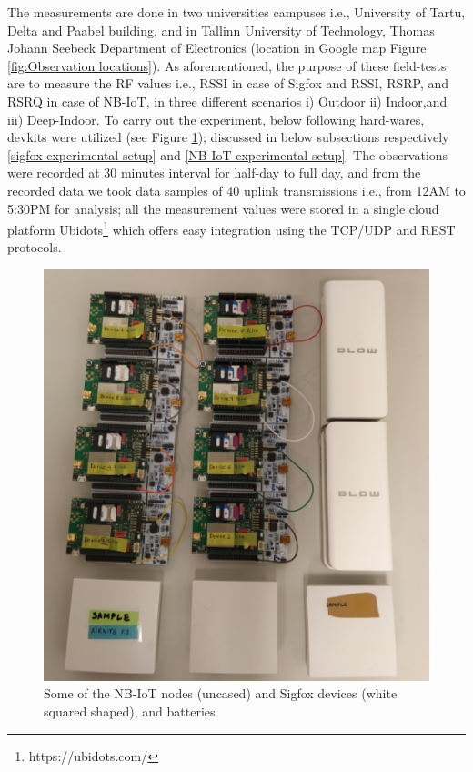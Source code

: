 \documentclass[12pt]{article}
\begin{document}
The measurements are done in two universities campuses i.e., University of Tartu, Delta and Paabel building, and in Tallinn University of Technology, Thomas Johann Seebeck Department of Electronics (location in Google map Figure \ref{fig:Observation locations}). As aforementioned, the purpose of these field-tests are to measure the RF values i.e., RSSI in case of Sigfox and RSSI, RSRP, and RSRQ in case of NB-IoT, in three different scenarios i) Outdoor ii) Indoor,and iii) Deep-Indoor. To carry out the experiment, below following hard-wares, devkits were utilized (see Figure \ref{fig:Experimental Setup}); discussed in below subsections respectively \ref{sigfox experimental setup} and \ref{NB-IoT experimental setup}. The observations were recorded at 30 minutes interval for half-day to full day, and from the recorded data we took data samples of 40 uplink transmissions i.e., from 12AM to 5:30PM for analysis; all the measurement values were stored in a single cloud platform Ubidots\footnote{https://ubidots.com/} which offers easy integration using the TCP/UDP and REST protocols.


\begin{figure}[H]
    \centering
    \includegraphics[trim=1cm 0cm 2cm 1cm,clip=true,width=0.9\columnwidth,totalheight=7.5cm ,width=0.9\columnwidth,keepaspectratio]{Images/experimentSetup.pdf}
    \caption{Some of the  NB-IoT nodes (uncased) and Sigfox devices (white squared shaped), and batteries}
    \label{fig:Experimental Setup}
\end{figure}
\end{document}
